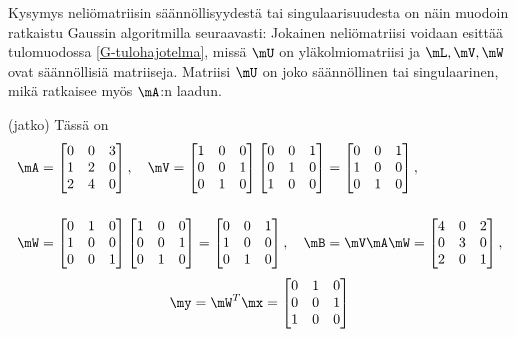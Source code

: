 Kysymys neliömatriisin säännöllisyydestä tai singulaarisuudesta on näin muodoin ratkaistu 
Gaussin algoritmilla seuraavasti: Jokainen neliömatriisi voidaan esittää tulomuodossa 
\eqref{G-tulohajotelma}, missä $\mU$ on yläkolmiomatriisi ja $\mL,\mV,\mW$ ovat säännöllisiä
 matriiseja. Matriisi $\mU$ on joko säännöllinen tai singulaarinen, mikä ratkaisee myös $\mA$:n
laadun.
\jatko
\begin{Exa} (jatko) Tässä on
\begin{align*}
\mA &= \begin{bmatrix} 0&0&3 \\1&2&0 \\2&4&0 \end{bmatrix}, \quad
\mV  = \begin{bmatrix} 1&0&0\\0&0&1\\0&1&0 \end{bmatrix} 
       \begin{bmatrix} 0&0&1\\0&1&0\\1&0&0 \end{bmatrix}
     = \begin{bmatrix} 0&0&1\\1&0&0\\0&1&0 \end{bmatrix}, \\[5mm]
\mW &= \begin{bmatrix} 0&1&0\\1&0&0\\0&0&1 \end{bmatrix} 
       \begin{bmatrix} 1&0&0\\0&0&1\\0&1&0 \end{bmatrix}
     = \begin{bmatrix} 0&0&1\\1&0&0\\0&1&0 \end{bmatrix}, \quad \mB = \mV\mA\mW 
     = \begin{bmatrix} 4&0&2\\0&3&0\\2&0&1 \end{bmatrix},
\end{align*}
\[
\my=\mW^T\mx = \begin{bmatrix} 0&1&0\\0&0&1\\1&0&0 \end{bmatrix} 
\]
\end{Exa}
